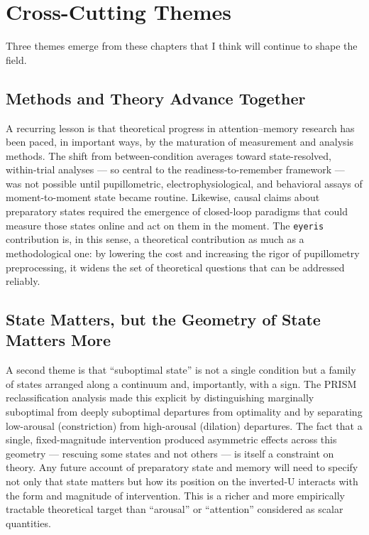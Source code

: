 \section{Cross-Cutting Themes}

Three themes emerge from these chapters that I think will continue to shape the field.

\subsection*{Methods and Theory Advance Together}

A recurring lesson is that theoretical progress in attention--memory research has been paced, in important ways, by the maturation of measurement and analysis methods. The shift from between-condition averages toward state-resolved, within-trial analyses --- so central to the readiness-to-remember framework --- was not possible until pupillometric, electrophysiological, and behavioral assays of moment-to-moment state became routine. Likewise, causal claims about preparatory states required the emergence of closed-loop paradigms that could measure those states online and act on them in the moment. The \texttt{eyeris} contribution is, in this sense, a theoretical contribution as much as a methodological one: by lowering the cost and increasing the rigor of pupillometry preprocessing, it widens the set of theoretical questions that can be addressed reliably.

\subsection*{State Matters, but the Geometry of State Matters More}

A second theme is that ``suboptimal state'' is not a single condition but a family of states arranged along a continuum and, importantly, with a sign. The PRISM reclassification analysis made this explicit by distinguishing marginally suboptimal from deeply suboptimal departures from optimality and by separating low-arousal (constriction) from high-arousal (dilation) departures. The fact that a single, fixed-magnitude intervention produced asymmetric effects across this geometry --- rescuing some states and not others --- is itself a constraint on theory. Any future account of preparatory state and memory will need to specify not only that state matters but how its position on the inverted-U interacts with the form and magnitude of intervention. This is a richer and more empirically tractable theoretical target than ``arousal'' or ``attention'' considered as scalar quantities.

